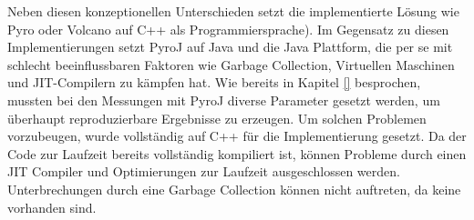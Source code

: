 Neben diesen konzeptionellen Unterschieden setzt die implementierte Lösung wie Pyro oder Volcano auf C++ als Programmiersprache). Im Gegensatz zu diesen Implementierungen setzt PyroJ auf Java und die Java Plattform, die per se mit schlecht beeinflussbaren Faktoren wie Garbage Collection, Virtuellen Maschinen und JIT-Compilern zu kämpfen hat. Wie bereits in Kapitel \ref{} besprochen, mussten bei den Messungen mit PyroJ diverse Parameter gesetzt werden, um überhaupt reproduzierbare Ergebnisse zu erzeugen. Um solchen Problemen vorzubeugen, wurde vollständig auf C++ für die Implementierung gesetzt. Da der Code zur Laufzeit bereits vollständig kompiliert ist, können Probleme durch einen JIT Compiler und Optimierungen zur Laufzeit ausgeschlossen werden. Unterbrechungen durch eine Garbage Collection können nicht auftreten, da keine vorhanden sind.